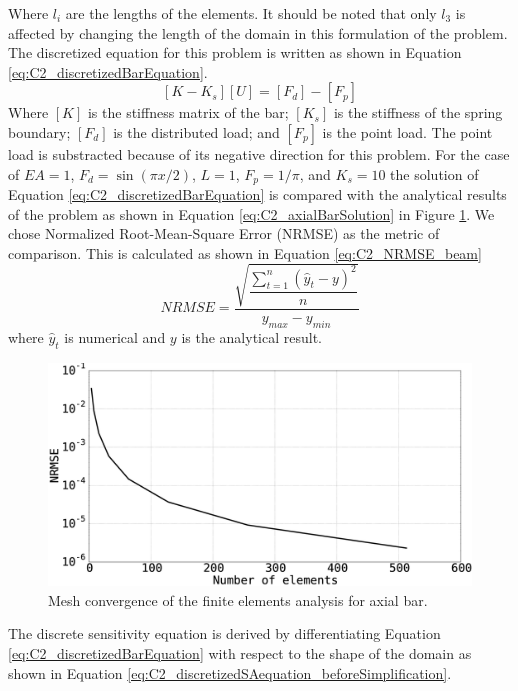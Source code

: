 %
Where $l_i$ are the lengths of the elements. It should be noted that only $l_3$ is affected by changing the length of the domain in this formulation of the problem. The discretized equation for this problem is written as shown in Equation \eqref{eq:C2_discretizedBarEquation}.
%
\begin{equation}\label{eq:C2_discretizedBarEquation}
    [K - K_s] [U] = [F_d] - [F_p]
\end{equation}
%
Where $[K]$ is the stiffness matrix of the bar; $[K_s]$ is the stiffness of the spring boundary; $[F_d]$ is the distributed load; and $[F_p]$ is the point load. The point load is substracted because of its negative direction for this problem. For the case of $EA = 1$, $F_d = \sin(\pi x / 2)$, $L = 1$, $F_p = 1 / \pi$, and $K_s = 10$ the solution of Equation \eqref{eq:C2_discretizedBarEquation} is compared with the analytical results of the problem as shown in Equation \eqref{eq:C2_axialBarSolution} in Figure \ref{fig:C2_axialBarSolution}. We chose Normalized Root-Mean-Square Error (NRMSE) as the metric of comparison. This is calculated as shown in Equation \eqref{eq:C2_NRMSE_beam}
%
\begin{equation}\label{eq:C2_NRMSE_beam}
    NRMSE = \dfrac{\sqrt{\dfrac{\sum_{t=1}^n \left( \hat{y}_t - y \right)^2}{n}}}{y_{max} - y_{min}}
\end{equation}
%
where $\hat{y}_t$ is numerical and $y$ is the analytical result.
%
\begin{figure}[h]
    \centering
    \includegraphics[width=14.00cm]{Chapter_2/figure/axial_bar_governing_equation_mesh_convergence.eps}
    \caption{Mesh convergence of the finite elements analysis for axial bar.}
    \label{fig:C2_axialBarSolution}
\end{figure}
%
The discrete sensitivity equation is derived by differentiating Equation \eqref{eq:C2_discretizedBarEquation} with respect to the shape of the domain as shown in Equation \eqref{eq:C2_discretizedSAequation_beforeSimplification}.
